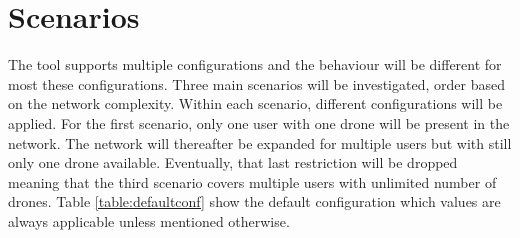 \chapter{Scenarios}
\label{chap:scenarios}
The tool supports multiple configurations and the behaviour will be different for most these configurations. Three main scenarios 
will be investigated, order based on the network complexity. Within each scenario, different configurations will be applied.
For the first scenario, only one user with one drone will be present in the network. The network will thereafter be expanded
for multiple users but with still only one drone available. Eventually, that last restriction will be dropped meaning 
that the third scenario covers multiple users with unlimited number of drones. 
Table \ref{table:defaultconf} show the default configuration which values are always applicable unless mentioned otherwise.

